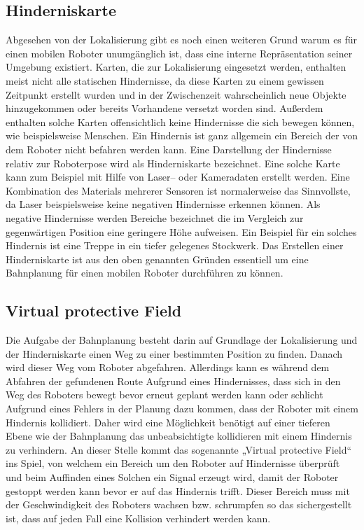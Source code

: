 \subsection{Hinderniskarte}
Abgesehen von der Lokalisierung gibt es noch einen weiteren Grund warum es für einen mobilen Roboter unumgänglich ist,
 dass eine interne Repräsentation seiner Umgebung existiert. Karten, die zur Lokalisierung eingesetzt werden,
 enthalten meist nicht alle statischen Hindernisse, da diese Karten zu einem gewissen Zeitpunkt erstellt wurden und
 in der Zwischenzeit wahrscheinlich neue Objekte hinzugekommen oder bereits Vorhandene versetzt worden sind.
 Außerdem enthalten solche Karten offensichtlich keine Hindernisse die sich bewegen können, wie beispielsweise Menschen.
 Ein Hindernis ist ganz allgemein ein Bereich der von dem Roboter nicht befahren werden kann. Eine Darstellung der Hindernisse
 relativ zur Roboterpose wird als Hinderniskarte bezeichnet. Eine solche Karte
 kann zum Beispiel mit Hilfe von Laser-- oder Kameradaten erstellt werden.
 Eine Kombination des Materials mehrerer Sensoren ist normalerweise das Sinnvollste,
 da Laser beispielsweise keine negativen Hindernisse erkennen können.
 Als negative Hindernisse werden Bereiche bezeichnet die im Vergleich zur
 gegenwärtigen Position eine geringere Höhe aufweisen.
 Ein Beispiel für ein solches Hindernis ist eine Treppe in ein tiefer gelegenes
 Stockwerk. Das Erstellen einer Hinderniskarte ist aus den oben genannten
 Gründen essentiell um eine Bahnplanung für einen mobilen Roboter
 durchführen zu können.
\subsection{Virtual protective Field}
Die Aufgabe der Bahnplanung besteht darin auf Grundlage der Lokalisierung und der Hinderniskarte einen Weg zu einer
 bestimmten Position zu finden. Danach wird dieser Weg vom Roboter abgefahren. Allerdings kann es während dem Abfahren der gefundenen
 Route Aufgrund eines Hindernisses, dass sich in den Weg des Roboters bewegt bevor erneut geplant werden kann oder
 schlicht Aufgrund eines Fehlers in der Planung dazu kommen, dass der Roboter mit einem Hindernis kollidiert.
 Daher wird eine Möglichkeit benötigt auf einer tieferen Ebene wie der Bahnplanung das unbeabsichtigte kollidieren mit einem Hindernis
 zu verhindern. An dieser Stelle kommt das sogenannte „Virtual protective Field“ ins Spiel, von welchem ein Bereich um den Roboter auf
 Hindernisse überprüft und beim Auffinden eines Solchen ein Signal erzeugt wird, damit der Roboter gestoppt werden kann bevor er
 auf das Hindernis trifft. Dieser Bereich muss mit der Geschwindigkeit des
 Roboters wachsen bzw. schrumpfen so das sichergestellt ist, dass auf jeden
 Fall eine Kollision verhindert werden kann.

